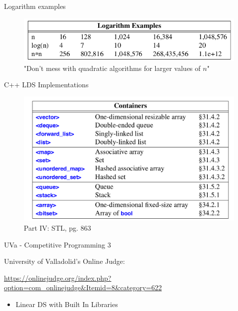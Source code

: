 \documentclass{beamer}
\begin{document}
\begin{frame}{Logarithm examples}
    \begin{figure}
        \centering
        \includegraphics[scale=0.4]{imgs/2-LDS/log_examples.png}
        \caption{"Don’t mess with quadratic algorithms for larger values of $n$"}
        \label{fig:my_label_9}
    \end{figure}
\end{frame}

\begin{frame}{C++ LDS Implementations}
    \begin{figure}
        \centering
        \includegraphics[scale=0.25]{imgs/2-LDS/c++containers.png}
        \caption{Part IV: STL, pg. 863 \cite{Stroustrup}}
        \label{fig:my_label_7}
    \end{figure}
\end{frame}

\begin{frame}{UVa - Competitive Programming 3}
    
    University of Valladolid's Online Judge: 
    
    \url{https://onlinejudge.org/index.php?option=com_onlinejudge&Itemid=8&category=622}
    
    \begin{itemize}
        \item Linear DS with Built In Libraries
    \end{itemize}
\end{frame}
\end{document}
